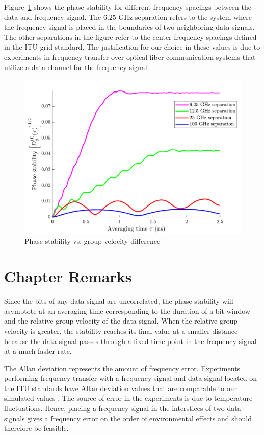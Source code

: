 Figure~\ref{fig:GVPhaseStability} shows the phase stability for different frequency spacings between the data and frequency signal. The $6.25$ GHz separation refers to the system where the frequency signal is placed in the boundaries of two neighboring data signals. The other separations in the figure refer to the center frequency spacings defined in the ITU grid standard. The justification for our choice in these values is due to experiments in frequency transfer over optical fiber communication systems that utilize a data channel for the frequency signal.
%
\begin{figure}[htb]
	\centering
	\includegraphics[scale=0.9]{img/GVPhaseStability}
	\caption{Phase stability vs. group velocity difference} \label{fig:GVPhaseStability}
\end{figure}
%

\section{Chapter Remarks}

Since the bits of any data signal are uncorrelated, the phase stability will asymptote at an averaging time corresponding to the duration of a bit window and the relative group velocity of the data signal. When the relative group velocity is greater, the stability reaches its final value at a smaller distance because the data signal passes through a fixed time point in the frequency signal at a much faster rate. 

The Allan deviation represents the amount of frequency error. Experiments performing frequency transfer with a frequency signal and data signal located on the ITU standards have Allan deviation values that are comparable to our simulated values \cite{Serrano2013,cantin2017progress}. The source of error in the experiments is due to temperature fluctuations. Hence, placing a frequency signal in the interstices of two data signals gives a frequency error on the order of environmental effects and should therefore be feasible.